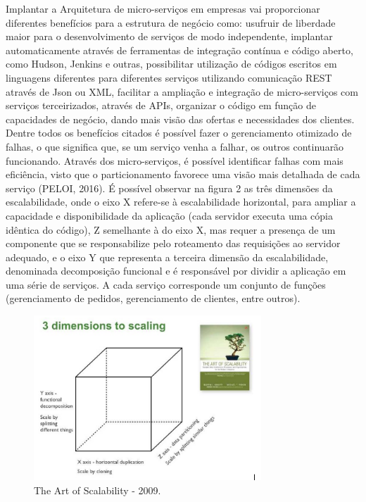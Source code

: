 Implantar a Arquitetura de micro-serviços em empresas vai proporcionar diferentes benefícios para a estrutura de negócio como: usufruir de liberdade maior para o desenvolvimento de serviços de modo independente, implantar automaticamente através de ferramentas de integração contínua e código aberto, como Hudson, Jenkins e outras, possibilitar utilização de códigos escritos em linguagens diferentes para diferentes serviços utilizando comunicação REST através de Json ou XML, facilitar a ampliação e integração de micro-serviços com serviços terceirizados, através de APIs, organizar o código em função de capacidades de negócio, dando mais visão das ofertas e necessidades dos clientes. Dentre todos os benefícios citados é possível fazer o gerenciamento otimizado de falhas, o que significa que, se um serviço venha a falhar, os outros continuarão funcionando. Através dos micro-serviços, é possível identificar falhas com mais eficiência, visto que o particionamento favorece uma visão mais detalhada de cada serviço (PELOI, 2016). É possível observar na figura 2 as três dimensões da escalabilidade, onde o eixo X refere-se à escalabilidade horizontal, para ampliar a capacidade e disponibilidade da aplicação (cada servidor executa uma cópia idêntica do código), Z semelhante à do eixo X,  mas requer a presença de um componente que se responsabilize pelo roteamento das requisições ao servidor adequado, e o eixo Y que representa a terceira dimensão da escalabilidade, denominada decomposição funcional e é responsável por dividir a aplicação em uma série de serviços. A cada serviço corresponde um conjunto de funções (gerenciamento de pedidos, gerenciamento de clientes, entre outros).

\begin{figure}[h]
\centering
\includegraphics[height=6.2cm]{imagens/scalability}
\caption{The Art of Scalability - 2009.}
\label{fig:exemplo}
\end{figure}



